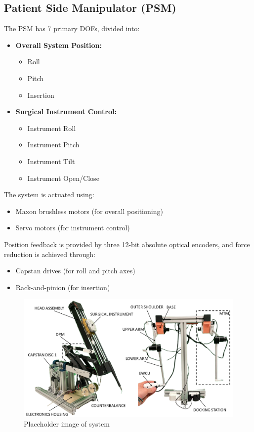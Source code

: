 \subsection{Patient Side Manipulator (PSM)}
The PSM has 7 primary DOFs, divided into:

\begin{itemize}
    \item \textbf{Overall System Position:}
        \begin{itemize}
            \item Roll
            \item Pitch
            \item Insertion
        \end{itemize}
    \item \textbf{Surgical Instrument Control:}
        \begin{itemize}
            \item Instrument Roll
            \item Instrument Pitch
            \item Instrument Tilt
            \item Instrument Open/Close
        \end{itemize}
\end{itemize}

The system is actuated using:
\begin{itemize}
    \item Maxon brushless motors (for overall positioning)
    \item Servo motors (for instrument control)
\end{itemize}

Position feedback is provided by three 12-bit absolute optical encoders, and force reduction is achieved through:
\begin{itemize}
    \item Capstan drives (for roll and pitch axes)
    \item Rack-and-pinion (for insertion)
\end{itemize}

\begin{figure}[h]
    \centering
    \includegraphics[width=0.75\linewidth]{figures/design/system_overview.png}
    \caption{Placeholder image of system}
    \label{fig:system_overview_placeholder}
\end{figure}


